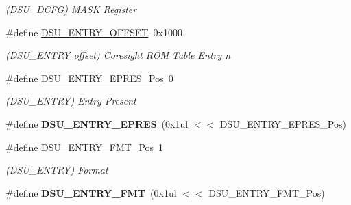 \begin{DoxyCompactItemize}
\begin{DoxyCompactList}\small\item\em (D\+S\+U\+\_\+\+D\+C\+F\+G) M\+A\+S\+K Register \end{DoxyCompactList}\item 
\hypertarget{group___s_a_m_l21___d_s_u_gabf579a43c4cd13d6c94af6656ad564fd}{}\#define \hyperlink{group___s_a_m_l21___d_s_u_gabf579a43c4cd13d6c94af6656ad564fd}{D\+S\+U\+\_\+\+E\+N\+T\+R\+Y\+\_\+\+O\+F\+F\+S\+E\+T}~0x1000\label{group___s_a_m_l21___d_s_u_gabf579a43c4cd13d6c94af6656ad564fd}

\begin{DoxyCompactList}\small\item\em (D\+S\+U\+\_\+\+E\+N\+T\+R\+Y offset) Coresight R\+O\+M Table Entry n \end{DoxyCompactList}\item 
\hypertarget{group___s_a_m_l21___d_s_u_ga17db89e8a7cdd4950fb0f754cdf91c9e}{}\#define \hyperlink{group___s_a_m_l21___d_s_u_ga17db89e8a7cdd4950fb0f754cdf91c9e}{D\+S\+U\+\_\+\+E\+N\+T\+R\+Y\+\_\+\+E\+P\+R\+E\+S\+\_\+\+Pos}~0\label{group___s_a_m_l21___d_s_u_ga17db89e8a7cdd4950fb0f754cdf91c9e}

\begin{DoxyCompactList}\small\item\em (D\+S\+U\+\_\+\+E\+N\+T\+R\+Y) Entry Present \end{DoxyCompactList}\item 
\hypertarget{group___s_a_m_l21___d_s_u_gaf9d14d3c1085ee9a8ddc2e7c0f4e2c1d}{}\#define {\bfseries D\+S\+U\+\_\+\+E\+N\+T\+R\+Y\+\_\+\+E\+P\+R\+E\+S}~(0x1ul $<$$<$ D\+S\+U\+\_\+\+E\+N\+T\+R\+Y\+\_\+\+E\+P\+R\+E\+S\+\_\+\+Pos)\label{group___s_a_m_l21___d_s_u_gaf9d14d3c1085ee9a8ddc2e7c0f4e2c1d}

\item 
\hypertarget{group___s_a_m_l21___d_s_u_ga64b5a6e8e4e1cb7c47f263c9ec0c0eb0}{}\#define \hyperlink{group___s_a_m_l21___d_s_u_ga64b5a6e8e4e1cb7c47f263c9ec0c0eb0}{D\+S\+U\+\_\+\+E\+N\+T\+R\+Y\+\_\+\+F\+M\+T\+\_\+\+Pos}~1\label{group___s_a_m_l21___d_s_u_ga64b5a6e8e4e1cb7c47f263c9ec0c0eb0}

\begin{DoxyCompactList}\small\item\em (D\+S\+U\+\_\+\+E\+N\+T\+R\+Y) Format \end{DoxyCompactList}\item 
\hypertarget{group___s_a_m_l21___d_s_u_ga4cd9b410d66436af77429ab7c66fe798}{}\#define {\bfseries D\+S\+U\+\_\+\+E\+N\+T\+R\+Y\+\_\+\+F\+M\+T}~(0x1ul $<$$<$ D\+S\+U\+\_\+\+E\+N\+T\+R\+Y\+\_\+\+F\+M\+T\+\_\+\+Pos)\label{group___s_a_m_l21___d_s_u_ga4cd9b410d66436af77429ab7c66fe798}


\end{DoxyCompactItemize}

